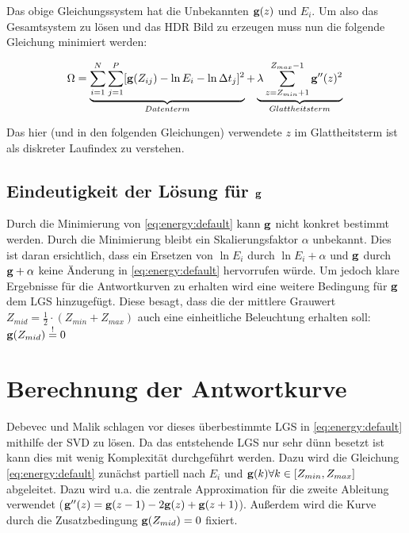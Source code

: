 Das obige Gleichungssystem hat die Unbekannten $\mathbf g(z)$ und $E_i$. Um also das Gesamtsystem zu lösen und das \gls{HDR} Bild zu erzeugen muss nun die folgende Gleichung minimiert werden:

\begin{equation}
\label{eq:energy:default}
\Omega = \underbrace{\sum \limits_{i=1}^{N} \sum \limits_{j=1}^{P}[\mathbf g(Z_{ij}) - \ln E_i - \ln \Delta t_j]^2}_{Datenterm} + \underbrace{\lambda  \sum \limits_{z=Z_{min}+1}^{Z_{max}-1} \mathbf{g}''(z)^2}_{Glattheitsterm}\\
\end{equation}

Das hier (und in den folgenden Gleichungen) verwendete $z$ im Glattheitsterm ist als diskreter Laufindex zu verstehen. 

\subsection{Eindeutigkeit der Lösung für $\mathbf g$}
\label{sec:eindeutigkeit}
Durch die Minimierung von \autoref{eq:energy:default} kann $\mathbf g$ nicht konkret bestimmt werden. Durch die Minimierung bleibt ein Skalierungsfaktor $\alpha$ unbekannt. Dies ist daran ersichtlich, dass ein Ersetzen von $\ln E_i$ durch $\ln E_i + \alpha$ und $\mathbf g$ durch $\mathbf g + \alpha$ keine Änderung in \autoref{eq:energy:default} hervorrufen würde. Um jedoch klare Ergebnisse für die Antwortkurven zu erhalten wird eine weitere Bedingung für $\mathbf g$ dem \gls{LGS} hinzugefügt. Diese besagt, dass die der mittlere Grauwert $Z_{mid} = \frac{1}{2}\cdot(Z_{min}+Z_{max})$ auch eine einheitliche Beleuchtung erhalten soll: $\mathbf g(Z_{mid}) \overset{!}{=} 0$

\section{Berechnung der Antwortkurve}
Debevec und Malik schlagen vor dieses überbestimmte \gls{LGS} in \autoref{eq:energy:default} mithilfe der \gls{SVD} zu lösen. Da das entstehende \gls{LGS} nur sehr dünn besetzt ist kann dies mit wenig Komplexität durchgeführt werden. Dazu wird die Gleichung \autoref{eq:energy:default} zunächst partiell nach $E_i$ und $\mathbf g(k) \forall k \in [Z_{min}, Z_{max}]$ abgeleitet. Dazu wird u.a. die zentrale Approximation für die zweite Ableitung verwendet ($\mathbf{g}''(z) = \mathbf g(z-1)-2\mathbf g(z)+\mathbf g(z+1)$). Außerdem wird die Kurve durch die Zusatzbedingung $\mathbf g (Z_{mid}) = 0$ fixiert.



